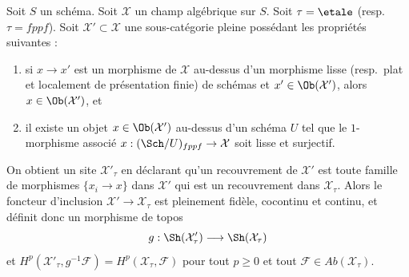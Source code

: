 \begin{lemma}
\label{lemma-cohomology-on-subcategory}
Soit $S$ un schéma. Soit $\mathcal{X}$ un champ algébrique sur $S$.
Soit $\tau = \etale$ (resp.\ $\tau = fppf$). Soit
$\mathcal{X}' \subset \mathcal{X}$ une sous-catégorie pleine possédant les
propriétés suivantes :
\begin{enumerate}
\item si $x \to x'$ est un morphisme de $\mathcal{X}$ au-dessus d'un morphisme
lisse (resp.\ plat et localement de présentation finie) de
schémas et $x' \in \Ob(\mathcal{X}')$, alors $x \in \Ob(\mathcal{X}')$, et
\item il existe un objet $x \in \Ob(\mathcal{X}')$ au-dessus
d'un schéma $U$ tel que le $1$-morphisme associé
$x : (\Sch/U)_{fppf} \to \mathcal{X}$ soit lisse et surjectif.
\end{enumerate}
On obtient un site $\mathcal{X}'_\tau$ en déclarant qu'un recouvrement de $\mathcal{X}'$
est toute famille de morphismes $\{x_i \to x\}$ dans $\mathcal{X}'$ qui est un
recouvrement dans $\mathcal{X}_\tau$. Alors le foncteur d'inclusion
$\mathcal{X}' \to \mathcal{X}_\tau$ est pleinement fidèle, cocontinu et
continu, et définit donc un morphisme de topos
$$
g : \Sh(\mathcal{X}'_\tau) \longrightarrow \Sh(\mathcal{X}_\tau)
$$
et $H^p(\mathcal{X}'_\tau, g^{-1}\mathcal{F}) =
H^p(\mathcal{X}_\tau, \mathcal{F})$ pour tout $p \geq 0$ et tout
$\mathcal{F} \in \textit{Ab}(\mathcal{X}_\tau)$.
\end{lemma}

